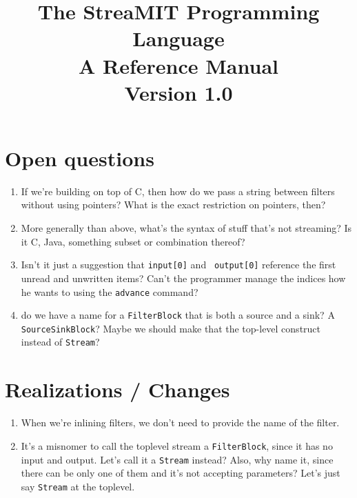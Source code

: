 \documentclass[draft]{article}
\title{The StreaMIT Programming Language \\ A Reference Manual \\ Version 1.0}
\begin{document}
\maketitle

\section{Open questions}

\begin{enumerate}

\item If we're building on top of C, then how do we pass a string
between filters without using pointers?  What is the exact restriction
on pointers, then?

\item More generally than above, what's the syntax of stuff that's not
streaming?  Is it C, Java, something subset or combination thereof?

\item Isn't it just a suggestion that {\tt input[0]} and {\tt
output[0]} reference the first unread and unwritten items?  Can't the
programmer manage the indices how he wants to using the {\tt advance}
command?

\item do we have a name for a {\tt FilterBlock} that is both a source
and a sink?  A {\tt SourceSinkBlock}?  Maybe we should make that the
top-level construct instead of {\tt Stream}?

\end{enumerate}

\section{Realizations / Changes}

\begin{enumerate}

\item When we're inlining filters, we don't need to provide the name
of the filter.

\item It's a misnomer to call the toplevel stream a {\tt FilterBlock},
since it has no input and output.  Let's call it a {\tt Stream}
instead?  Also, why name it, since there can be only one of them and
it's not accepting parameters?  Let's just say {\tt Stream} at the
toplevel.

\end{enumerate}
\end{document}
